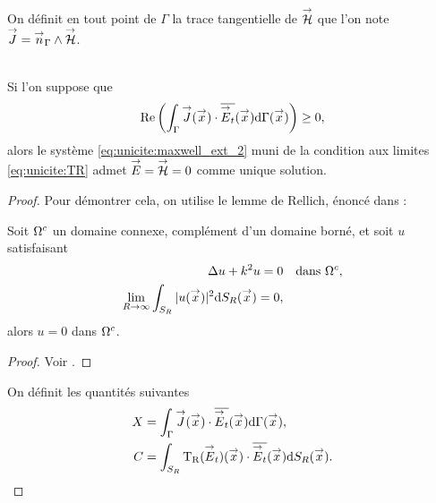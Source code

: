   On définit en tout point de \(\Gamma\) la trace tangentielle de \({\overset{\rightarrow}{\mathcal{H}}}\) que l'on note \({\overset{\rightarrow}{J}} = {\overset{\rightarrow}{n}}_\Gamma \wedge {\overset{\rightarrow}{\mathcal{H}}}\).
  \begin{prop}~\\
    Si l'on suppose que
    \begin{equation}
      \label{eq:unicite:form_var:cgu}
      \operatorname{Re}\left(\int_\Gamma {\overset{\rightarrow}{J}}({\overset{\rightarrow}{x}}) \cdot {\overline{{\overset{\rightarrow}{E}}_t}}({\overset{\rightarrow}{x}}) \mathrm{d}{\Gamma({\overset{\rightarrow}{x}})}\right) \ge 0,
    \end{equation}
    alors le système \eqref{eq:unicite:maxwell_ext_2} muni de la condition aux limites \eqref{eq:unicite:TR} admet \({\overset{\rightarrow}{E}}={\overset{\rightarrow}{\mathcal{H}}}=0\) comme unique solution.
  \end{prop}

\begin{proof}
  Pour démontrer cela, on utilise le lemme de Rellich, énoncé dans \cite[p.~74]{cessenat_mathematical_1996}:
  \begin{lemme}
    Soit \(\Omega^c\) un domaine connexe, complément d'un domaine borné, et soit \(u\) satisfaisant
    \begin{subequations}
      \begin{align}
        \Delta u + k^2 u = 0 & &\text{dans \(\Omega^c\)},
        \\
        \lim_{R\rightarrow\infty}\int_{S_R} |u({\overset{\rightarrow}{x}})|^2 \mathrm{d}{S_R}({\overset{\rightarrow}{x}}) = 0,
      \end{align}
    \end{subequations}
    alors \(u=0\) dans \(\Omega^c\).
  \end{lemme}
  \begin{proof}
    Voir \cite[p.~74]{cessenat_mathematical_1996}.
  \end{proof}

  On définit les quantités suivantes
  \begin{align}
    X &= \int_\Gamma {\overset{\rightarrow}{J}}({\overset{\rightarrow}{x}}) \cdot {\overline{{\overset{\rightarrow}{E}}_t}}({\overset{\rightarrow}{x}})\mathrm{d}{\Gamma({\overset{\rightarrow}{x}})},
    \label{eq:unicite:x}
    \\
    C &= \int_{S_R} \operatorname{T_R}({\overset{\rightarrow}{E}}_t)({\overset{\rightarrow}{x}})  \cdot {\overline{{\overset{\rightarrow}{E}}_t}}({\overset{\rightarrow}{x}})\mathrm{d}{S_R({\overset{\rightarrow}{x}})}.
  \end{align}


\end{proof}
